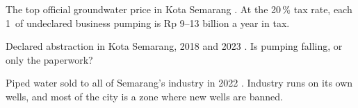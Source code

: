 \begin{tcbraster}[raster columns=3,raster equal height,raster column skip=3mm,raster before skip=1mm,raster after skip=0mm]
\begin{tcolorbox}[tile=warmsoft]
The top official groundwater price in Kota Semarang \cite{pergub7}. At the 20\,\% tax rate, each
1\Mm\ of undeclared business pumping is Rp 9--13 billion a year in tax.
\end{tcolorbox}
\begin{tcolorbox}[tile=warmsoft]
Declared abstraction in Kota Semarang, 2018 and 2023 \cite{perdasmg,esdmdata}. Is pumping falling, or only
the paperwork?
\end{tcolorbox}
\begin{tcolorbox}[tile=warmsoft]
Piped water sold to all of Semarang's industry in 2022 \cite{perdasmg}. Industry runs on its own wells,
and most of the city is a zone where new wells are banned.
\end{tcolorbox}
\end{tcbraster}

